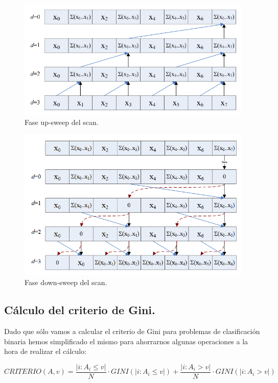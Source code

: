 \begin{figure}[ht]
\centering
\includegraphics[scale=0.6]{imagenes/upsweep.png}
\caption{Fase up-sweep del scan.}
\label{image:upsweep}
\end{figure}

\begin{figure}[ht]
\centering
\includegraphics[scale=0.6]{imagenes/downsweep.png}
\caption{Fase down-sweep del scan.}
\label{image:downsweep}
\end{figure}


\subsection{Cálculo del criterio de Gini.}
Dado que sólo vamos a calcular el criterio de Gini para problemas de clasificación binaria hemos simplificado el mismo para ahorrarnos algunas operaciones a la hora de realizar el cálculo:

$$CRITERIO(A,v) = \frac{|i: A_i \leq v|}{N} \cdot GINI(|i: A_i \leq v|) + \frac{|i: A_i > v|}{N} \cdot GINI(|i: A_i > v|)$$

